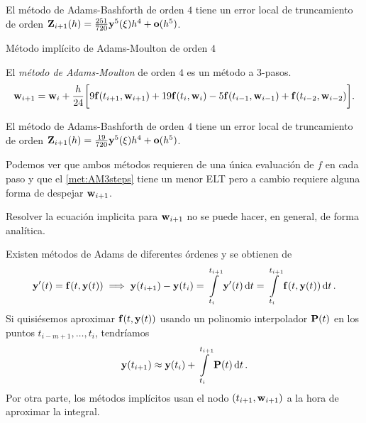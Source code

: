 \begin{proposition}
    El método de Adams-Bashforth de orden $4$
    tiene un error local de truncamiento
    de orden $\vb{Z}{}_{i+1}(h) = \frac{251}{720}\vb{y}{}^5(\xi)h^4 + \vb{o}{}(h^5)$.
\end{proposition}

\begin{method}{Método implícito de Adams-Moulton de orden $4$}
    \label{met:AM3steps}

    El \emph{método de Adams-Moulton} de orden $4$
    es un método a $3$-pasos.
    \begin{equation}
        \vb{w}{}_{i+1} = \vb{w}{}_i + \frac{h}{24}\qty\bigg[
            9\vb{f}{}(t_{i+1}, \vb{w}{}_{i+1}) + 19\vb{f}{}(t_i, \vb{w}{}_i)
            - 5\vb{f}{}(t_{i-1}, \vb{w}{}_{i-1}) + \vb{f}{}(t_{i-2}, \vb{w}{}_{i-2})
        ].
    \end{equation}
\end{method}

\begin{proposition}
    El método de Adams-Bashforth de orden $4$
    tiene un error local de truncamiento
    de orden $\vb{Z}{}_{i+1}(h) = \frac{19}{720}\vb{y}{}^5(\xi)h^4 + \vb{o}{}(h^5)$.
\end{proposition}

Podemos ver que ambos métodos requieren de una única evaluación de $f$
en cada paso y que el \cref{met:AM3steps} tiene un menor ELT pero a cambio
requiere alguna forma de despejar $\vb{w}{}_{i+1}$.

\begin{remark}
    Resolver la ecuación implicita para $\vb{w}{}_{i+1}$ no se puede hacer,
    en general, de forma analítica.
\end{remark}

\begin{remark}
    Existen métodos de Adams de diferentes órdenes y se obtienen de
    \begin{equation*}
        \vb{y}{}'(t) = \vb{f}{}(t,\vb{y}{}(t)) \implies
        \vb{y}{}(t_{i+1}) - \vb{y}{}(t_i) =
        \int\limits_{t_i}^{t_{i+1}} \vb{y}{}'(t) \dd{t} =
        \int\limits_{t_i}^{t_{i+1}} \vb{f}{}(t,\vb{y}{}(t)) \dd{t}.
    \end{equation*}
    Si quisiésemos aproximar $\vb{f}{}(t,\vb{y}{}(t))$ usando un polinomio interpolador
    $\vb{P}(t)$ en los puntos $t_{i-m+1},\dots,t_i$,
    tendríamos
    \begin{equation*}
        \vb{y}{}(t_{i+1}) \approx
        \vb{y}{}(t_i) + \int\limits_{t_i}^{t_{i+1}} \vb{P}(t) \dd{t}.
    \end{equation*}
    Por otra parte, los métodos implícitos usan el nodo $(t_{i+1}, \vb{w}{}_{i+1})$
    a la hora de aproximar la integral.
\end{remark}

